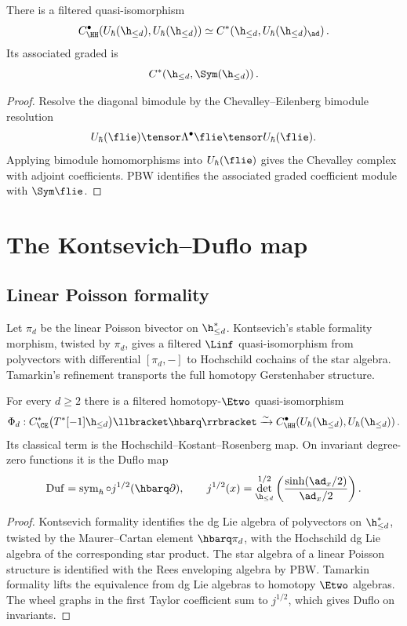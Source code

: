\begin{proposition}
There is a filtered quasi-isomorphism
\[
 C^\bullet_{\HH}\!
 \left(U_\hbar(\h_{\le d}),U_\hbar(\h_{\le d})\right)
 \simeq
 C^*\!\left(\h_{\le d},U_\hbar(\h_{\le d})_{\ad}\right).
\]
Its associated graded is
\[
 C^*\!\left(\h_{\le d},\Sym(\h_{\le d})\right).
\]
\end{proposition}
\begin{proof}
Resolve the diagonal bimodule by the Chevalley--Eilenberg bimodule resolution
\[
 U_\hbar(\flie)\tensor\Lambda^\bullet\flie\tensor U_\hbar(\flie).
\]
Applying bimodule homomorphisms into $U_\hbar(\flie)$ gives the Chevalley complex with adjoint coefficients.  PBW identifies the associated graded coefficient module with $\Sym\flie$.
\end{proof}

\chapter{The Kontsevich--Duflo map}
\section{Linear Poisson formality}
Let $\pi_d$ be the linear Poisson bivector on $\h_{\le d}^*$.  Kontsevich's stable formality morphism, twisted by $\pi_d$, gives a filtered $\Linf$ quasi-isomorphism from polyvectors with differential $[\pi_d,-]$ to Hochschild cochains of the star algebra.  Tamarkin's refinement transports the full homotopy Gerstenhaber structure.

\begin{theorem}
For every $d\ge2$ there is a filtered homotopy-$\Etwo$ quasi-isomorphism
\[
 \Phi_d:
 C^*_{\CE}\bigl(T^*[-1]\h_{\le d}\bigr)\llbracket\hbarq\rrbracket
 \xrightarrow{\sim}
 C^\bullet_{\HH}\!
 \left(U_\hbar(\h_{\le d}),U_\hbar(\h_{\le d})\right).
\]
Its classical term is the Hochschild--Kostant--Rosenberg map.  On invariant degree-zero functions it is the Duflo map
\[
 \operatorname{Duf}
 =\operatorname{sym}_\hbar\circ j^{1/2}(\hbarq\partial),
 \qquad
 j^{1/2}(x)=
 \det_{\h_{\le d}}^{1/2}
 \left(\frac{\sinh(\ad_x/2)}{\ad_x/2}\right).
\]
\end{theorem}
\begin{proof}
Kontsevich formality identifies the dg Lie algebra of polyvectors on $\h_{\le d}^*$, twisted by the Maurer--Cartan element $\hbarq\pi_d$, with the Hochschild dg Lie algebra of the corresponding star product.  The star algebra of a linear Poisson structure is identified with the Rees enveloping algebra by PBW.  Tamarkin formality lifts the equivalence from dg Lie algebras to homotopy $\Etwo$ algebras.  The wheel graphs in the first Taylor coefficient sum to $j^{1/2}$, which gives Duflo on invariants.
\end{proof}

